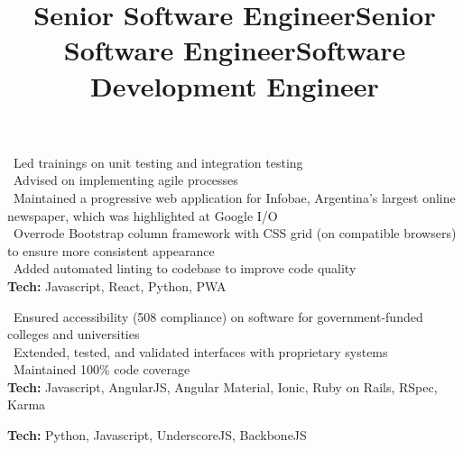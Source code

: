         \title{Senior Software Engineer}
        \begin{position}
            \textbullet \ Led trainings on unit testing and integration testing\\
            \textbullet \ Advised on implementing agile processes\\
			\textbullet \ Maintained a progressive web application for Infobae, Argentina's largest online newspaper, which was highlighted at Google I/O\\
			\textbullet \ Overrode Bootstrap column framework with CSS grid (on compatible browsers) to ensure more consistent appearance\\
			\textbullet \ Added automated linting to codebase to improve code quality\\
			\textbf{Tech:} Javascript, React, Python, PWA
        \end{position}
        
        \title{Senior Software Engineer}
        \begin{position}
			\textbullet \ Ensured accessibility (508 compliance) on software for government-funded colleges and universities\\
			\textbullet \ Extended, tested, and validated interfaces with proprietary systems\\
			\textbullet \ Maintained 100\% code coverage\\
			\textbf{Tech:} Javascript, AngularJS, Angular Material, Ionic, Ruby on Rails, RSpec, Karma
        \end{position}


        \title{Software Development Engineer}
        \begin{position}
			\textbf{Tech:} Python, Javascript, UnderscoreJS, BackboneJS
        \end{position}


